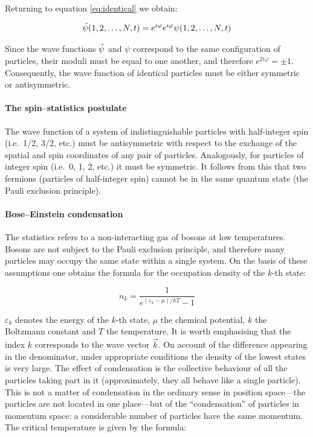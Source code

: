 Returning to equation \ref{eq:identical} we obtain:

\begin{equation}
    \Tilde{\psi} (1,2,\dots,N,t) = e^{i\varphi}e^{i\varphi} \psi (1,2,\dots,N,t)
\end{equation}

Since the wave functions $\Tilde{\psi}$ and $\psi$ correspond to the same configuration of particles, their moduli must be equal to one another, and therefore $e^{2i\varphi} = \pm 1$. Consequently, the wave function of identical particles must be either symmetric or antisymmetric.

\paragraph{The spin--statistics postulate}

The wave function of a system of indistinguishable particles with half-integer spin (i.e.\ 1/2, 3/2, etc.) must be antisymmetric with respect to the exchange of the spatial and spin coordinates of any pair of particles. Analogously, for particles of integer spin (i.e.\ 0, 1, 2, etc.) it must be symmetric. It follows from this that two fermions (particles of half-integer spin) cannot be in the same quantum state (the Pauli exclusion principle).

\paragraph{Bose--Einstein condensation}

The statistics refers to a non-interacting gas of bosons at low temperatures. Bosons are not subject to the Pauli exclusion principle, and therefore many particles may occupy the same state within a single system. On the basis of these assumptions one obtains the formula for the occupation density of the $k$-th state:

\begin{equation}
    n_k = \frac{1}{e^{(\varepsilon_k - \mu)/kT} - 1}
\end{equation}

$\varepsilon_k$ denotes the energy of the $k$-th state, $\mu$ the chemical potential, $k$ the Boltzmann constant and $T$ the temperature. It is worth emphasising that the index $k$ corresponds to the wave vector $\vec{k}$. On account of the difference appearing in the denominator, under appropriate conditions the density of the lowest states is very large. The effect of condensation is the collective behaviour of all the particles taking part in it (approximately, they all behave like a single particle). This is not a matter of condensation in the ordinary sense in position space---the particles are not located in one place---but of the ``condensation'' of particles in momentum space: a considerable number of particles have the same momentum. The critical temperature is given by the formula:

